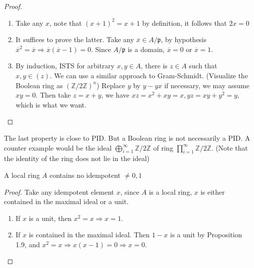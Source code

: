 \documentclass{solution}
\begin{document}
\begin{proof}
    \begin{enumerate}
        \item Take any $x$, note that $(x + 1)^2 = x + 1$ by definition, it follows that $2x = 0$
        \item It suffices to prove the latter. Take any $\overline{x} \in A / \mathfrak{p}$, by hypothesis $\overline{x}^2 = \overline{x} \Rightarrow \overline{x}(\overline{x} - 1) = 0$. Since $A / \mathfrak{p}$ is a domain, $\overline{x} = 0$ or $\overline{x} = 1$.
        \item By induction, ISTS for arbitrary $x, y \in A$, there is $z \in A$ such that $x, y \in (z)$. We can use a similar approach to Gram-Schmidt. (Visualize the Boolean ring as $(\mathbb{Z} / 2 \mathbb{Z})^n$) Replace $y$ by $y - yx$ if necessary, we may assume $xy = 0$. Then take $z = x + y$, we have $xz = x^2 + xy = x, yz = xy + y^2 = y$, which is what we want.
    \end{enumerate}
\end{proof}

\begin{remark}
    The last property is close to PID. {\color{red} But a Boolean ring is not necessarily a PID}. A counter example would be the ideal $\bigoplus_{i = 1}^{\infty} \mathbb{Z} / 2 \mathbb{Z}$ of ring $\prod\limits_{i = 1}^{\infty} \mathbb{Z} / 2 \mathbb{Z}$. (Note that the identity of the ring does not lie in the ideal)
\end{remark}

\begin{problem}
    A local ring $A$ contains no idempotent $\ne 0, 1$
\end{problem}

\begin{proof}
    Take any idempotent element $x$, since $A$ is a local ring, $x$ is either contained in the maximal ideal or a unit.
    \begin{enumerate}
        \item If $x$ is a unit, then $x^2 = x \Rightarrow x = 1$.
        \item If $x$ is contained in the maximal ideal. Then $1 - x$ is a unit by Proposition 1.9, and $x^2 = x \Rightarrow x(x - 1) = 0 \Rightarrow x = 0$.
    \end{enumerate}
\end{proof}
\end{document}
